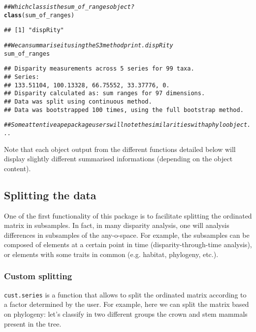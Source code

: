 \documentclass{article}\usepackage[]{graphicx}\usepackage[]{color}
\makeatletter
\newcommand{\hlcom}[1]{\textcolor[rgb]{0.678,0.584,0.686}{\textit{#1}}}%
\newcommand{\hlstd}[1]{\textcolor[rgb]{0.345,0.345,0.345}{#1}}%
\newcommand{\hlkwd}[1]{\textcolor[rgb]{0.737,0.353,0.396}{\textbf{#1}}}%
\newenvironment{kframe}{%
 \def\at@end@of@kframe{}%
 \ifinner\ifhmode%
  \def\at@end@of@kframe{\end{minipage}}%
  \begin{minipage}{\columnwidth}%
 \fi\fi%
 \def\FrameCommand##1{\hskip\@totalleftmargin \hskip-\fboxsep
 \colorbox{shadecolor}{##1}\hskip-\fboxsep
     \hskip-\linewidth \hskip-\@totalleftmargin \hskip\columnwidth}%
 \MakeFramed {\advance\hsize-\width
   \@totalleftmargin\z@ \linewidth\hsize
   \@setminipage}}%
 {\par\unskip\endMakeFramed%
 \at@end@of@kframe}
\newenvironment{knitrout}{}{} %
\makeatother
\begin{document}
\begin{knitrout}
\color{fgcolor}\begin{kframe}
\begin{alltt}
\hlcom{## Which class is the sum_of_ranges object?}
\hlkwd{class}\hlstd{(sum_of_ranges)}
\end{alltt}
\begin{verbatim}
## [1] "dispRity"
\end{verbatim}
\begin{alltt}
\hlcom{## We can summarise it using the S3 method print.dispRity}
\hlstd{sum_of_ranges}
\end{alltt}
\begin{verbatim}
## Disparity measurements across 5 series for 99 taxa. 
## Series:
## 133.51104, 100.13328, 66.75552, 33.37776, 0.
## Disparity calculated as: sum ranges for 97 dimensions.
## Data was split using continuous method.
## Data was bootstrapped 100 times, using the full bootstrap method.
\end{verbatim}
\begin{alltt}
\hlcom{## Some attentive ape package users will note the similarities with a phylo object...}
\end{alltt}
\end{kframe}
\end{knitrout}

Note that each object output from the different functions detailed below will display slightly different summarised informations (depending on the object content).

\subsection{Splitting the data}
One of the first functionality of this package is to facilitate splitting the ordinated matrix in subsamples.
In fact, in many disparity analysis, one will analysis differences in subsamples of the any-o-space.
For example, the subsamples can be composed of elements at a certain point in time (disparity-through-time analysis), or elements with some traits in common (e.g. habitat, phylogeny, etc.).

\subsubsection{Custom splitting}
\texttt{cust.series} is a function that allows to split the ordinated matrix according to a factor determined by the user.
For example, here we can split the matrix based on phylogeny: let's classify in two different groups the crown and stem mammals present in the tree.
\end{document}
